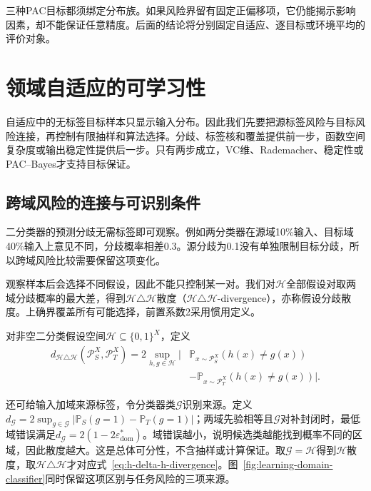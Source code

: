 三种PAC目标都须绑定分布族。如果风险界留有固定正偏移项，它仍能揭示影响因素，却不能保证任意精度。后面的结论将分别固定自适应、逐目标或环境平均的评价对象。

\section{领域自适应的可学习性}
\label{sec:domain-adaptation}

自适应中的无标签目标样本只显示输入分布。因此我们先要把源标签风险与目标风险连接，再控制有限抽样和算法选择。分歧、标签核和覆盖提供前一步，函数空间复杂度或输出稳定性提供后一步。只有两步成立，VC维、Rademacher、稳定性或PAC--Bayes才支持目标保证。

\subsection{跨域风险的连接与可识别条件}
\label{sec:adaptation-risk}

二分类器的预测分歧无需标签即可观察。例如两分类器在源域10\%输入、目标域40\%输入上意见不同，分歧概率相差0.3。源分歧为0.1没有单独限制目标分歧，所以跨域风险比较需要保留这项变化。

观察样本后会选择不同假设，因此不能只控制某一对。我们对$\mathcal H$全部假设对取两域分歧概率的最大差，得到$\mathcal H\triangle\mathcal H$散度（$\mathcal H\triangle\mathcal H$-divergence），亦称假设分歧散度。上确界覆盖所有可能选择，前置系数2采用惯用定义。

\begin{definition}[假设分歧散度]
\label{def:h-delta-h-divergence}
对非空二分类假设空间$\mathcal H\subseteq\{0,1\}^{X}$，定义
\begin{equation}
 \begin{aligned}
 d_{\mathcal H\triangle\mathcal H}(\mathcal P_S^X,\mathcal P_T^X)
 =2\sup_{h,g\in\mathcal H}
 \big|&\mathbb P_{x\sim\mathcal P_S^X}(h(x)\neq g(x))\\
       &-\mathbb P_{x\sim\mathcal P_T^X}(h(x)\neq g(x))\big|.
 \end{aligned}
 \label{eq:h-delta-h-divergence}
\end{equation}
\end{definition}

还可给输入加域来源标签，令分类器类$\mathcal G$识别来源。定义$d_{\mathcal G}=2\sup_{g\in\mathcal G}|\mathbb P_S(g=1)-\mathbb P_T(g=1)|$；两域先验相等且$\mathcal G$对补封闭时，最低域错误满足$d_{\mathcal G}=2(1-2\varepsilon_{\mathrm{dom}}^*)$。域错误越小，说明候选类越能找到概率不同的区域，因此散度越大。这是总体可分性，不含抽样或计算保证。取$\mathcal G=\mathcal H$得到$\mathcal H$散度，取$\mathcal H\triangle\mathcal H$才对应式~\eqref{eq:h-delta-h-divergence}。图~\ref{fig:learning-domain-classifier}同时保留这项区别与任务风险的三项来源。

